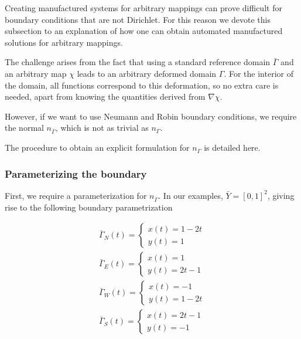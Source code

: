 \documentclass{article}
\begin{document}
Creating manufactured systems for arbitrary mappings can prove difficult for boundary conditions that are not Dirichlet.
For this reason we devote this subsection to an explanation of how one can obtain automated manufactured solutions for arbitrary mappings.

The challenge arises from the fact that using a standard reference domain $\bar{\Gamma}$ and an arbitrary map $\chi$ leads to an arbitrary deformed domain $\Gamma$.
For the interior of the domain, all functions correspond to this deformation, so no extra care is needed, apart from knowing the quantities derived from $\nabla \chi$.

However, if we want to use Neumann and Robin boundary conditions, we require the normal $n_{\bar{\Gamma}}$, which is not as trivial as $n_{\Gamma}$.

The procedure to obtain an explicit formulation for $n_{\Gamma}$ is detailed here.

\subsubsection{Parameterizing the boundary}

First, we require a parameterization for $n_{\bar{\Gamma}}$. In our examples, $\bar{Y} = [0,1]^2$, giving rise to the following boundary parametrization

\begin{equation}
    \begin{split}
        \bar{\Gamma}_N(t) = \begin{cases}
            x(t) = 1 - 2t\\
            y(t) = 1
        \end{cases} \\
        \bar{\Gamma}_E(t)= \begin{cases}
            x(t) = 1\\
            y(t) = 2t - 1
        \end{cases} \\
        \bar{\Gamma}_W(t) = \begin{cases}
            x(t) = -1\\
            y(t) = 1 - 2t
        \end{cases} \\
        \bar{\Gamma}_S(t) = \begin{cases}
            x(t) = 2t - 1\\
            y(t) = -1
        \end{cases}
    \end{split}
\end{equation}
\end{document}
